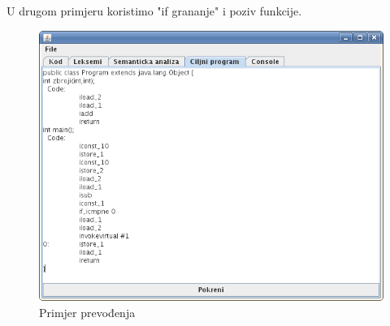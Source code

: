 U drugom primjeru koristimo "if grananje" i poziv funkcije.



\begin{figure}[H]
  \centering
    \includegraphics[width=13cm]{primjer-bytecode3}
  \caption{Primjer prevođenja}
\end{figure}

